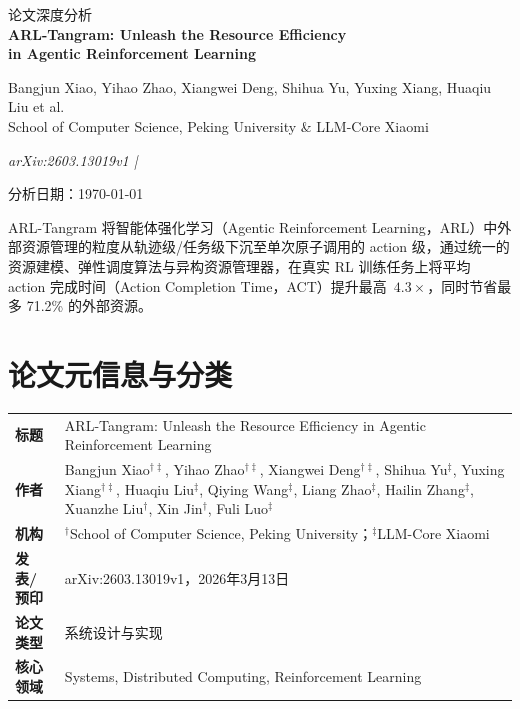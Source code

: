 \documentclass[11pt, a4paper]{article}
\newcommand{\shorttitle}{}
\newcommand{\papertitle}[1]{%
  \renewcommand{\shorttitle}{#1}%
  \begin{center}
    \vspace*{0.3cm}
    {\small\sffamily\color{SubtleGray} 论文深度分析}\\[0.6em]
    {\LARGE\bfseries\sffamily\color{PrimaryBlue} #1}
  \end{center}
}
\newcommand{\paperauthors}[1]{%
  \begin{center}{\normalsize\color{DarkText} #1}\end{center}
}
\newcommand{\papervenue}[1]{%
  \begin{center}{\small\color{SubtleGray}\itshape #1}\end{center}
}
\newcommand{\paperdate}[1]{%
  \begin{center}{\small\color{SubtleGray} 分析日期：#1}\end{center}
}
\begin{document}
\papertitle{ARL-Tangram: Unleash the Resource Efficiency\\in Agentic Reinforcement Learning}
\paperauthors{Bangjun Xiao, Yihao Zhao, Xiangwei Deng, Shihua Yu, Yuxing Xiang, Huaqiu Liu et al.\\
  School of Computer Science, Peking University \quad \& \quad LLM-Core Xiaomi}
\papervenue{arXiv:2603.13019v1 \quad | }
\paperdate{\today}

\vspace{0.8em}

\begin{keyinsight}[一句话总结]
ARL-Tangram 将智能体强化学习（Agentic Reinforcement Learning，ARL）中外部资源管理的粒度从轨迹级/任务级下沉至单次原子调用的 action 级，通过统一的资源建模、弹性调度算法与异构资源管理器，在真实 RL 训练任务上将平均 action 完成时间（Action Completion Time，ACT）提升最高~$4.3\times$，同时节省最多 71.2\% 的外部资源。
\end{keyinsight}

\vspace{0.5em}

{
  \hypersetup{linkcolor=DarkText}
  \tableofcontents
}

\newpage

\section{论文元信息与分类}

\begin{infobox}[论文信息]
\begin{tabular}{@{}p{2.8cm}p{10.5cm}@{}}
\textbf{标题} & ARL-Tangram: Unleash the Resource Efficiency in Agentic Reinforcement Learning \\[4pt]
\textbf{作者} & Bangjun Xiao$^{\dagger\ddagger}$, Yihao Zhao$^{\dagger\ddagger}$, Xiangwei Deng$^{\dagger\ddagger}$, Shihua Yu$^{\ddagger}$, Yuxing Xiang$^{\dagger\ddagger}$, Huaqiu Liu$^{\ddagger}$, Qiying Wang$^{\ddagger}$, Liang Zhao$^{\ddagger}$, Hailin Zhang$^{\ddagger}$, Xuanzhe Liu$^{\dagger}$, Xin Jin$^{\dagger}$, Fuli Luo$^{\ddagger}$ \\[4pt]
\textbf{机构} & $^\dagger$School of Computer Science, Peking University；$^\ddagger$LLM-Core Xiaomi \\[4pt]
\textbf{发表/预印} & arXiv:2603.13019v1，2026年3月13日 \\[4pt]
\textbf{论文类型} & 系统设计与实现 \\[4pt]
\textbf{核心领域} & Systems, Distributed Computing, Reinforcement Learning \\
\end{tabular}
\end{infobox}
\end{document}
